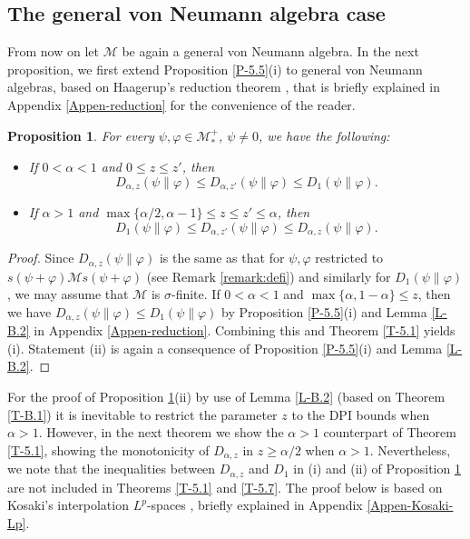 \documentclass[12pt]{article}
\newtheorem{prop}[theorem]{Proposition}
\theoremstyle{definition}
\theoremstyle{remark}
\numberwithin{equation}{section}
\def\Me{\mathcal M}
\def\ffi{\varphi}
\begin{document}
\subsection{The general von Neumann algebra case}\label{Sec-5.2}

{
From now on let $\Me$ be again a general von Neumann algebra. In the next proposition, we first
extend Proposition \ref{P-5.5}(i) to general von Neumann algebras, based on Haagerup's reduction
theorem \cite{haagerup2010areduction}, that is briefly explained in Appendix \ref{Appen-reduction} for
the convenience of the reader.

\begin{prop}\label{P-5.6}
For every $\psi,\ffi\in\Me_*^+$, $\psi\ne0$, we have the following:
\begin{itemize}
\item[(i)] If $0<\alpha<1$ and $0\le z\le z'$, then
\[
D_{\alpha,z}(\psi\|\ffi)\le D_{\alpha,z'}(\psi\|\ffi)\le D_1(\psi\|\ffi).
\]
\item[(ii)] If $\alpha>1$ and $\max\{\alpha/2,\alpha-1\}\le z\le z'\le\alpha$, then
\[
D_1(\psi\|\ffi)\le D_{\alpha,z'}(\psi\|\ffi)\le D_{\alpha,z}(\psi\|\ffi).
\]
\end{itemize}
\end{prop}

\begin{proof}
Since $D_{\alpha,z}(\psi\|\ffi)$ is the same as that for $\psi,\ffi$ restricted to $s(\psi+\ffi)\Me s(\psi+\ffi)$
(see Remark \ref{remark:defi}) and similarly for $D_1(\psi\|\ffi)$, we may assume that $\Me$ is
$\sigma$-finite. If $0<\alpha<1$ and $\max\{\alpha,1-\alpha\}\le z$, then we have
$D_{\alpha,z}(\psi\|\ffi)\le D_1(\psi\|\ffi)$ by Proposition \ref{P-5.5}(i) and Lemma \ref{L-B.2} in
Appendix \ref{Appen-reduction}. Combining this and Theorem \ref{T-5.1} yields (i). Statement (ii) is
again a consequence of Proposition \ref{P-5.5}(i) and Lemma \ref{L-B.2}.
\end{proof}

For the proof of Proposition \ref{P-5.6}(ii) by use of Lemma \ref{L-B.2} (based on Theorem \ref{T-B.1})
it is inevitable to restrict the parameter $z$ to the DPI bounds when $\alpha>1$. However, in the next
theorem we show the $\alpha>1$ counterpart of Theorem \ref{T-5.1}, showing the monotonicity of
$D_{\alpha,z}$ in $z\ge\alpha/2$ when $\alpha>1$. Nevertheless, we note that the inequalities between
$D_{\alpha,z}$ and $D_1$ in (i) and (ii) of Proposition \ref{P-5.6} are not included in
Theorems \ref{T-5.1} and \ref{T-5.7}. The proof below is based on Kosaki's interpolation $L^p$-spaces
\cite{kosaki1984applications}, briefly explained in Appendix \ref{Appen-Kosaki-Lp}.}
\end{document}
